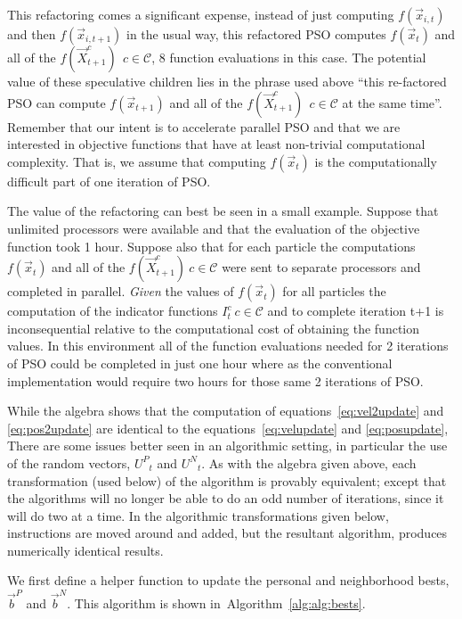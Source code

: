 \documentclass[journal,letterpaper]{IEEEtran}
\newcommand{\alg}[1]{Algorithm~\ref{alg:#1}}
\providecommand{\pers}{\ensuremath{P}}
\providecommand{\neigh}{\ensuremath{N}}
\providecommand{\nURand}{\ensuremath{U^\neigh}}
\providecommand{\pURand}{\ensuremath{U^\pers}}
\providecommand{\ppos}{\ensuremath{\Vec{x}}}
\providecommand{\nbest}{\ensuremath{\Vec{b}^\neigh}}
\providecommand{\pbest}{\ensuremath{\Vec{b}^\pers}}
\providecommand{\ofunc}{\ensuremath{f}}
\providecommand{\indic}{\ensuremath{I}}
\providecommand{\specpos}{\ensuremath{\vec{X}}}
\providecommand{\caseset}{\ensuremath{\mathcal{C}}}
\begin{document}
This refactoring comes a significant expense, instead of just computing
$\ofunc(\ppos_{i,t})$ and then $\ofunc(\ppos_{i,t+1})$ in the usual way, this refactored PSO
computes $\ofunc(\ppos_{t})$ and all 
of the $\ofunc(\specpos_{t+1}^{c}) \ \ c \in \caseset$, 8 function evaluations in this case.
The potential value of these speculative children lies in the phrase used above
``this re-factored PSO
can compute $\ofunc(\ppos_{t+1})$ and all 
of the $\ofunc(\specpos_{t+1}^{c}) \ \ c \in \caseset$ at the same time''. 
Remember that our intent is to accelerate parallel PSO and that we
are interested in objective functions that have at least non-trivial computational
complexity.
That is, we assume that computing
$\ofunc(\ppos_{t})$ is the computationally difficult part of one iteration of PSO.

The value of the refactoring can best be seen in a small example.
Suppose that unlimited processors were available and that the evaluation of 
the objective function took 1 hour. Suppose also that for each particle
the computations
$\ofunc(\ppos_{t})$ and all 
of the $\ofunc(\specpos_{t+1}^{c}) \ c \in \caseset$ were sent to separate
processors and completed in parallel.
\emph{Given} the values 
of $\ofunc(\ppos_{t})$ for all particles
the computation of the indicator functions $\indic_{t}^{c} \ c \in \caseset$ and to complete iteration t+1
is inconsequential relative to the computational cost of obtaining the function values. 
In this environment all of the function evaluations needed for 2 iterations of PSO
could be completed in just one hour where as the conventional implementation would
require two hours for those same 2 iterations of PSO.

While the algebra shows that the computation of 
equations~\eqref{eq:vel2update} and \eqref{eq:pos2update} are identical to the 
equations~\eqref{eq:velupdate} and \eqref{eq:posupdate},
There are some issues better seen in an algorithmic setting, in particular the use of the random
vectors, 
$\pURand_{t}$ and $\nURand_{t}$.
As with the algebra given above, each transformation (used below) of the algorithm is
provably equivalent; except that the algorithms will no longer be able to do an odd number of iterations,
since it will do two at a time. In the algorithmic transformations given below,
instructions are moved around and added, but the
resultant algorithm, produces numerically identical results.

We first define a helper function to update the personal and neighborhood bests, $\pbest$ and $\nbest$.
This algorithm is shown in~\alg{alg:bests}.
\end{document}

